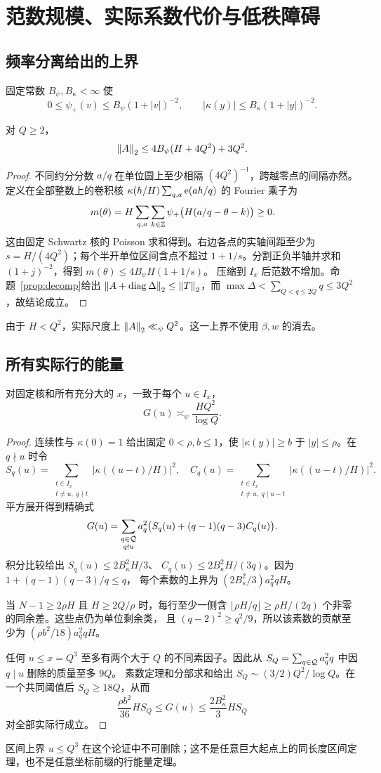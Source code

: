 \section{范数规模、实际系数代价与低秩障碍}\label{sec:barriers}
\subsection{频率分离给出的上界}
固定常数 $B_\psi,B_\kappa<\infty$ 使
\[
0\le\psi_+(v)\le B_\psi(1+|v|)^{-2},\qquad
|\kappa(y)|\le B_\kappa(1+|y|)^{-2}.
\]
\begin{lemma}\label{lem:upper}
对 $Q\ge2$，
\[
\left\|A\right\|_2\le4B_\psi(H+4Q^2)+3Q^2.
\]
\end{lemma}
\begin{proof}
不同约分分数 $a/q$ 在单位圆上至少相隔 $(4Q^2)^{-1}$，跨越零点的间隔亦然。定义在全部整数上的卷积核
$\kappa(h/H)\sum_{q,a}\mathrm e(ah/q)$ 的 Fourier 乘子为
\[
m(\theta)=H\sum_{q,a}\sum_{k\in\mathbb Z}
 \psi_+\big(H(a/q-\theta-k)\big)\ge0 .
\]
这由固定 Schwartz 核的 Poisson 求和得到。右边各点的实轴间距至少为
$s=H/(4Q^2)$；每个半开单位区间含点不超过 $1+1/s$。分割正负半轴并求和
$(1+j)^{-2}$，得到 $m(\theta)\le4B_\psi H(1+1/s)$。
压缩到 $I_x$ 后范数不增加。命题~\ref{prop:decomp}给出
$\left\|A+\operatorname{diag}\Delta\right\|_2\le\left\|T\right\|_2$，而
$\max\Delta<\sum_{Q<q\le2Q}q\le3Q^2$，故结论成立。
\end{proof}
由于 $H<Q^2$，实际尺度上 $\left\|A\right\|_2\ll_\psi Q^2$。这一上界不使用 $\beta,w$ 的消去。

\subsection{所有实际行的能量}
\begin{proposition}\label{prop:energy}
对固定核和所有充分大的 $x$，一致于每个 $u\in I_x$，
\[
G(u)\asymp_\psi \frac{HQ^2}{\log Q}.
\]
\end{proposition}
\begin{proof}
连续性与 $\kappa(0)=1$ 给出固定 $0<\rho,b\le1$，使 $|\kappa(y)|\ge b$ 于 $|y|\le\rho$。在 $q\nmid u$ 时令
\[
S_q(u)=\sum_{\substack{t\in I_x\\t\ne u,\ q\nmid t}}|\kappa((u-t)/H)|^2,\quad
C_q(u)=\sum_{\substack{t\in I_x\\t\ne u,\ q\mid u-t}}|\kappa((u-t)/H)|^2.
\]
平方展开得到精确式
\[
G(u)=\sum_{\substack{q\in\mathcal Q\\q\nmid u}}
 a_q^2\big(S_q(u)+(q-1)(q-3)C_q(u)\big).
\]
积分比较给出 $S_q(u)\le2B_\kappa^2H/3$、
$C_q(u)\le2B_\kappa^2H/(3q)$。因为 $1+(q-1)(q-3)/q\le q$，
每个素数的上界为 $(2B_\kappa^2/3)a_q^2qH$。

当 $N-1\ge2\rho H$ 且 $H\ge2Q/\rho$ 时，每行至少一侧含
$\lfloor\rho H/q\rfloor\ge\rho H/(2q)$ 个非零的同余差。这些点仍为单位剩余类，
且 $(q-2)^2\ge q^2/9$，所以该素数的贡献至少为
$(\rho b^2/18)a_q^2qH$。

任何 $u\le x=Q^3$ 至多有两个大于 $Q$ 的不同素因子。因此从
$S_Q=\sum_{q\in\mathcal Q}a_q^2q$ 中因 $q\mid u$ 删除的质量至多 $9Q$。
素数定理和分部求和给出
$S_Q\sim(3/2)Q^2/\log Q$。在一个共同阈值后 $S_Q\ge18Q$，从而
\[
\frac{\rho b^2}{36}HS_Q\le G(u)\le\frac{2B_\kappa^2}{3}HS_Q
\]
对全部实际行成立。
\end{proof}
区间上界 $u\le Q^3$ 在这个论证中不可删除；这不是任意巨大起点上的同长度区间定理，也不是任意坐标前缀的行能量定理。

